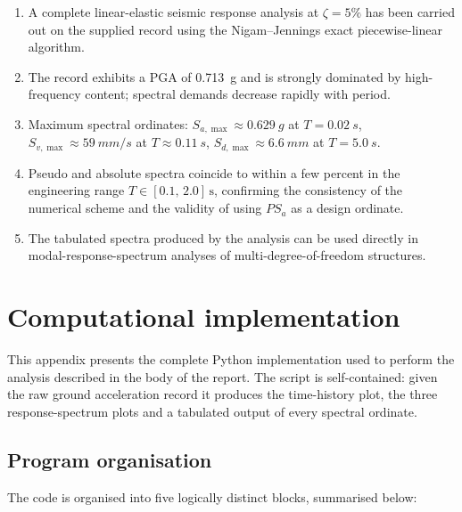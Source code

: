 \documentclass[11pt,a4paper]{article}
\begin{document}
\begin{enumerate}[leftmargin=1.4em,itemsep=0.15em]
  \item A complete linear-elastic seismic response analysis at
        $\zeta=5\%$ has been carried out on the supplied record using
        the Nigam--Jennings exact piecewise-linear algorithm.
  \item The record exhibits a PGA of \SI{0.713}{g} and is strongly
        dominated by high-frequency content; spectral demands decrease
        rapidly with period.
  \item Maximum spectral ordinates:
        $S_{a,\max} \approx \SI{0.629}{g}$ at $T = \SI{0.02}{s}$,
        $S_{v,\max} \approx \SI{59}{mm/s}$ at $T \approx \SI{0.11}{s}$,
        $S_{d,\max} \approx \SI{6.6}{mm}$ at $T = \SI{5.0}{s}$.
  \item Pseudo and absolute spectra coincide to within a few percent in
        the engineering range $T \in [0.1,\,2.0]\,\mathrm{s}$,
        confirming the consistency of the numerical scheme and the
        validity of using $PS_a$ as a design ordinate.
  \item The tabulated spectra produced by the analysis can be used
        directly in modal-response-spectrum analyses of
        multi-degree-of-freedom structures.
\end{enumerate}

\appendix
\section{Computational implementation}
\label{app:code}

This appendix presents the complete Python implementation used to
perform the analysis described in the body of the report. The script
is self-contained: given the raw ground acceleration record it
produces the time-history plot, the three response-spectrum plots
and a tabulated output of every spectral ordinate.

\subsection{Program organisation}
The code is organised into five logically distinct blocks, summarised
below:
\end{document}

